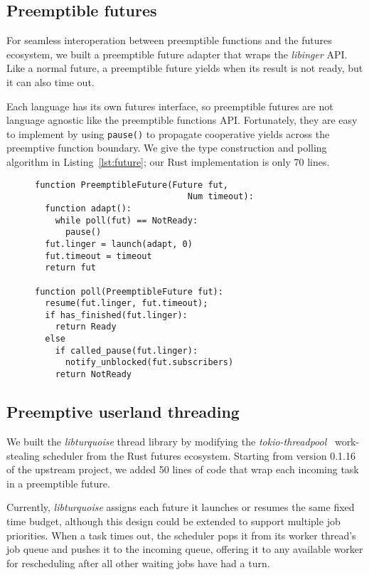 \subsection{Preemptible futures}

For seamless interoperation between preemptible functions and the futures ecosystem,
we built a preemptible future adapter that wraps the \textit{libinger} API.  Like a
normal future, a preemptible future yields when its result is not ready, but it can
also time out.

Each language has its own futures interface, so preemptible futures are not language
agnostic like the preemptible functions API.  Fortunately, they are easy to implement
by using
\texttt{pause()} to propagate cooperative yields across the preemptive function
boundary.  We give the type construction and polling algorithm in
Listing~\ref{lst:future}; our Rust implementation is only 70 lines.

\begin{figure}
\begin{lstlisting}[label=lst:future,caption=Futures adapter type (pseudocode)]
function PreemptibleFuture(Future fut,
                              Num timeout):
  function adapt():
    while poll(fut) == NotReady:
      pause()
  fut.linger = launch(adapt, 0)
  fut.timeout = timeout
  return fut

function poll(PreemptibleFuture fut):
  resume(fut.linger, fut.timeout);
  if has_finished(fut.linger):
    return Ready
  else
    if called_pause(fut.linger):
      notify_unblocked(fut.subscribers)
    return NotReady
\end{lstlisting}
\end{figure}


\subsection{Preemptive userland threading}

We built the \textit{libturquoise} thread library by modifying the
\textit{tokio-threadpool}~\cite{www-tokio-threadpool} work-stealing scheduler from
the Rust futures ecosystem.  Starting from version 0.1.16 of the upstream project, we
added 50 lines of code that wrap each incoming task in a preemptible future.

Currently, \textit{libturquoise} assigns each future it launches or resumes the same
fixed time budget, although this design could be extended to support
multiple job priorities.  When a task times out, the scheduler pops it from its
worker thread's job queue and pushes it to the incoming queue,
offering it to any available worker for rescheduling after all other waiting jobs
have had a turn.
